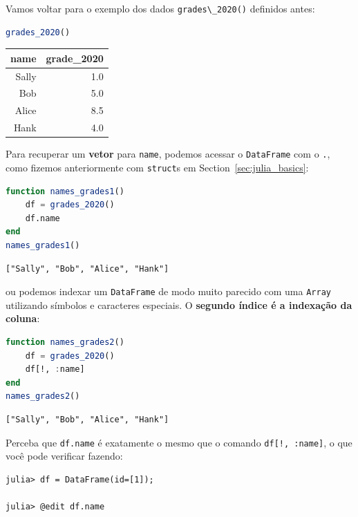 \documentclass[
  notoc %
]{tufte-book}
\newcommand{\passthrough}[1]{#1}
\begin{document}
Vamos voltar para o exemplo dos dados
\passthrough{\lstinline!grades\_2020()!} definidos antes:

\begin{lstlisting}[language=Julia]
grades_2020()
\end{lstlisting}

\begin{longtable}[]{@{}rr@{}}
\toprule
name & grade\_2020 \\
\midrule
\endhead
Sally & 1.0 \\
Bob & 5.0 \\
Alice & 8.5 \\
Hank & 4.0 \\
\bottomrule
\end{longtable}

Para recuperar um \textbf{vetor} para \passthrough{\lstinline!name!},
podemos acessar o \passthrough{\lstinline!DataFrame!} com o
\passthrough{\lstinline!.!}, como fizemos anteriormente com
\passthrough{\lstinline!struct!}s em Section~\ref{sec:julia_basics}:

\begin{lstlisting}[language=Julia]
function names_grades1()
    df = grades_2020()
    df.name
end
names_grades1()
\end{lstlisting}

\begin{lstlisting}[language=Output]
["Sally", "Bob", "Alice", "Hank"]
\end{lstlisting}

ou podemos indexar um \passthrough{\lstinline!DataFrame!} de modo muito
parecido com uma \passthrough{\lstinline!Array!} utilizando símbolos e
caracteres especiais. O \textbf{segundo índice é a indexação da coluna}:

\begin{lstlisting}[language=Julia]
function names_grades2()
    df = grades_2020()
    df[!, :name]
end
names_grades2()
\end{lstlisting}

\begin{lstlisting}[language=Output]
["Sally", "Bob", "Alice", "Hank"]
\end{lstlisting}

Perceba que \passthrough{\lstinline!df.name!} é exatamente o mesmo que o
comando \passthrough{\lstinline"df[!, :name]"}, o que você pode
verificar fazendo:

\begin{lstlisting}
julia> df = DataFrame(id=[1]);

julia> @edit df.name
\end{lstlisting}
\end{document}
